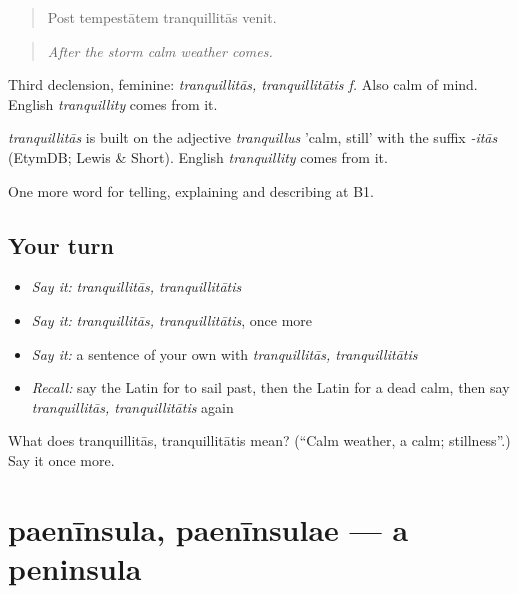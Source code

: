 \begin{quote}
Post tempestātem tranquillitās venit.
\end{quote}

\begin{quote}
\emph{After the storm calm weather comes.}
\end{quote}

Third declension, feminine: \emph{tranquillitās, tranquillitātis f.} Also calm of mind. English \emph{tranquillity} comes from it.

\begin{cousinweb}
\emph{tranquillitās} is built on the adjective \emph{tranquillus} 'calm, still' with the suffix \emph{-itās} (EtymDB; Lewis \& Short). English \emph{tranquillity} comes from it.
\end{cousinweb}

\begin{grammarlens}[title={What you've built}]
One more word for telling, explaining and describing at B1.
\end{grammarlens}

\subsection*{Your turn}
\begin{itemize}
\raggedright
  \item \emph{Say it:} \emph{tranquillitās, tranquillitātis}
  \item \emph{Say it:} \emph{tranquillitās, tranquillitātis}, once more
  \item \emph{Say it:} a sentence of your own with \emph{tranquillitās, tranquillitātis}
  \item \emph{Recall:} say the Latin for to sail past, then the Latin for a dead calm, then say \emph{tranquillitās, tranquillitātis} again
\end{itemize}

\begin{tcolorbox}[breakable,colback=teal!4,colframe=teal!35!black,title={Before you move on}]
What does tranquillitās, tranquillitātis mean? (\textquotedblleft{}Calm weather, a calm; stillness\textquotedblright{}.) Say it once more.
\end{tcolorbox}
\section[paenīnsula, paenīnsulae]{paenīnsula, paenīnsulae — a peninsula}

\label{lesson:LA-C444-paeninsula}



